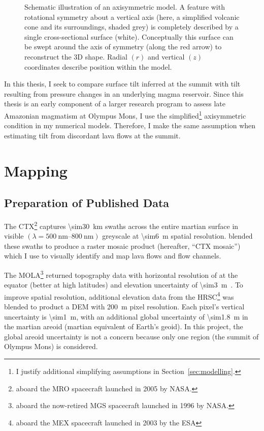 \begin{figure}
    \caption[Axisymmetry]{Schematic illustration of an axisymmetric model. A feature with rotational symmetry about a vertical axis (here, a simplified volcanic cone and its surroundings, shaded grey) is completely described by a single cross-sectional surface (white). Conceptually this surface can be swept around the axis of symmetry (along the red arrow) to reconstruct the 3D shape. Radial $(r)$ and vertical $(z)$ coordinates describe position within the model.}%
    \label{fig:axisymmetry}
\end{figure}    

In this thesis, I seek to compare surface tilt inferred at the summit with tilt resulting from pressure changes in an underlying magma reservoir. Since this thesis is an early component of a larger research program to assess late Amazonian magmatism at Olympus Mons, I use the simplified\footnote{I justify additional simplifying assumptions in Section~\ref{sec:modelling}.} axisymmetric condition in my numerical models. Therefore, I make the same assumption when estimating tilt from discordant lava flows at the summit.

\section{Mapping}\label{sec:mapping}
\subsection{Preparation of Published Data}

The \acf{CTX}\footnote{aboard the \ac{MRO} spacecraft launched in 2005 by \acs{NASA}.} captures \qty{\sim30}{\km} swaths across the entire martian surface in visible $(\lambda=\qtyrange{500}{800}{\nm})$ greyscale at \qty{\sim6}{\m} spatial resolution. \textcite{Dickson2018AGB} blended these swaths to produce a raster mosaic product (hereafter, ``\ac{CTX} mosaic'') which I use to visually identify and map lava flows and flow channels.

The \acf{MOLA}\footnote{aboard the now-retired \ac{MGS} spacecraft launched in 1996 by \acs{NASA}.} returned topography data with horizontal resolution of  at the equator (better at high latitudes) and elevation uncertainty of \qty{\sim3}{\m}~\parencite{smith_mars_2001}. To improve spatial resolution, additional elevation data from the \ac{HRSC}\footnote{aboard the \ac{MEX} spacecraft launched in 2003 by the \ac{ESA}} was blended to product a \ac{DEM} with \qty{200}{\m} pixel resolution. Each pixel's vertical uncertainty is \qty{\sim1}{\m}, with an additional global uncertainty of \qty{\sim1.8}{\m} in the martian areoid (martian equivalent of Earth's geoid). In this project, the global areoid uncertainty is not a concern because only one region (the summit of Olympus Mons) is considered.

